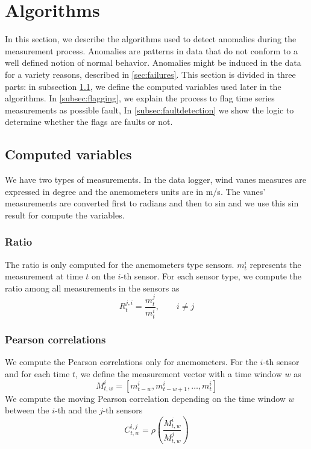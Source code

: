 \documentclass[journal]{IEEEtran}
\begin{document}

\section{Algorithms}\label{sec:algorithms}
In this section, we describe the algorithms used to detect anomalies during the measurement process. Anomalies are patterns in data that do not conform to a well defined notion of normal behavior. Anomalies might be induced in the data for a variety reasons, described in \ref{sec:failures}\cite{chandola2009anomaly}. This section is divided in three parts: in subsection \ref{subsec:computedvariables}, we define the computed variables used later in the algorithms. In \ref{subsec:flagging}, we explain the process to flag time series measurements as possible fault, In
\ref{subsec:faultdetection} we show the logic to determine whether the flags are faults or not.  
\subsection{Computed variables}\label{subsec:computedvariables}
We have two types of measurements. In the data logger, wind vanes measures are expressed in degree and the anemometers units are in m/s. The  vanes' measurements are converted first to radians and then to sin and we use this sin result for compute the variables.
\subsubsection{Ratio}
The ratio is only computed for the anemometers type sensors. $m_t^{i}$ represents the measurement at time $t$ on the $i$-th sensor.
For each sensor type, we compute the ratio among all measurements in the sensors as
\begin{equation} 
R_{t}^{j,i} = \frac{m_{t}^{j}}{m_{t}^{i}},\qquad i \neq j 
\end{equation} 

\subsubsection{Pearson correlations}
We compute the Pearson correlations only for anemometers. For the $i$-th sensor and for each time $t$, we define the measurement vector with a time window $w$ as 
\begin{equation}
M^i_{t,w} = [m_{t-w}^i,m_{t-w+1}^i,\ldots,m_t^i]
\end{equation}
We compute the moving Pearson correlation depending on the time window $w$ between the $i$-th and the $j$-th sensors
\begin{equation}
C^{i,j}_{t,w}= \rho\left( \frac{M^i_{t,w}}{M^j_{t,w}}\right)
\end{equation}
\end{document}
